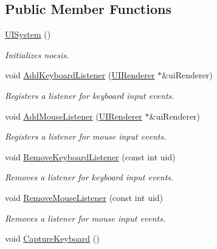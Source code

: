 \subsection*{Public Member Functions}
\begin{DoxyCompactItemize}
\item 
\hypertarget{class_u_i_system_ac930744c42c305f09deacd176045392b}{\hyperlink{class_u_i_system_ac930744c42c305f09deacd176045392b}{U\-I\-System} ()}\label{class_u_i_system_ac930744c42c305f09deacd176045392b}

\begin{DoxyCompactList}\small\item\em Initializes noesis. \end{DoxyCompactList}\item 
void \hyperlink{class_u_i_system_a45a982a524c4d35a383232984062e21f}{Add\-Keyboard\-Listener} (\hyperlink{class_u_i_renderer}{U\-I\-Renderer} $\ast$\&ui\-Renderer)
\begin{DoxyCompactList}\small\item\em Registers a listener for keyboard input events. \end{DoxyCompactList}\item 
void \hyperlink{class_u_i_system_a51a64e1ed2767a9f57c52195468ea3bf}{Add\-Mouse\-Listener} (\hyperlink{class_u_i_renderer}{U\-I\-Renderer} $\ast$\&ui\-Renderer)
\begin{DoxyCompactList}\small\item\em Registers a listener for mouse input events. \end{DoxyCompactList}\item 
void \hyperlink{class_u_i_system_a01f185ae5eb2dd12607cff3fbaaebad2}{Remove\-Keyboard\-Listener} (const int uid)
\begin{DoxyCompactList}\small\item\em Removes a listener for keyboard input events. \end{DoxyCompactList}\item 
void \hyperlink{class_u_i_system_a833da0ec7454752a7872d82051366aad}{Remove\-Mouse\-Listener} (const int uid)
\begin{DoxyCompactList}\small\item\em Removes a listener for mouse input events. \end{DoxyCompactList}\item 
\hypertarget{class_u_i_system_a2dd00ec5f796185c5d7601ec03c29695}{void \hyperlink{class_u_i_system_a2dd00ec5f796185c5d7601ec03c29695}{Capture\-Keyboard} ()}\label{class_u_i_system_a2dd00ec5f796185c5d7601ec03c29695}


\end{DoxyCompactItemize}
